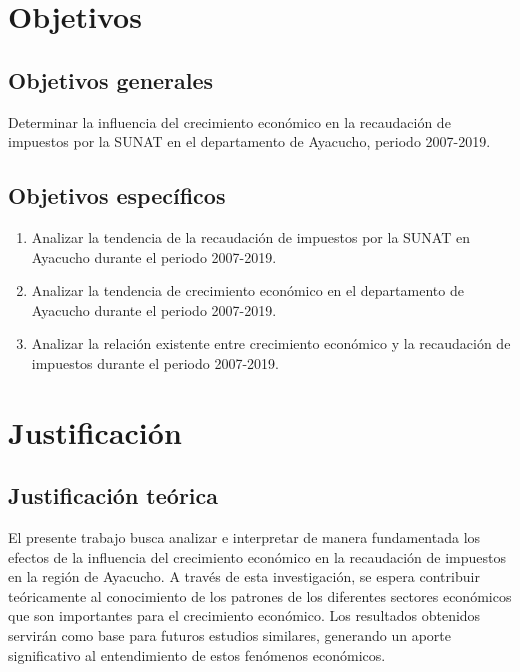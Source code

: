 \documentclass[
  jou,
  floatsintext,
  longtable,
  a4paper,
  nolmodern,
  notxfonts,
  notimes,
  12pt,
  colorlinks=true,linkcolor=blue,citecolor=blue,urlcolor=blue]{apa7}
\begin{document}
\section{Objetivos}\label{sec-objetivos}

\subsection{Objetivos generales}\label{sec-objetivos-generales}

Determinar la influencia del crecimiento económico en la recaudación de
impuestos por la SUNAT en el departamento de Ayacucho, periodo
2007-2019.

\subsection{Objetivos específicos}\label{sec-objetivos-especuxedficos}

\begin{enumerate}
\def\labelenumi{\arabic{enumi}.}
\item
  Analizar la tendencia de la recaudación de impuestos por la SUNAT en
  Ayacucho durante el periodo 2007-2019.
\item
  Analizar la tendencia de crecimiento económico en el departamento de
  Ayacucho durante el periodo 2007-2019.
\item
  Analizar la relación existente entre crecimiento económico y la
  recaudación de impuestos durante el periodo 2007-2019.
\end{enumerate}

\section{Justificación}\label{sec-justificaciuxf3n}

\subsection{Justificación
teórica}\label{sec-justificaciuxf3n-teuxf3rica}

El presente trabajo busca analizar e interpretar de manera fundamentada
los efectos de la influencia del crecimiento económico en la recaudación
de impuestos en la región de Ayacucho. A través de esta investigación,
se espera contribuir teóricamente al conocimiento de los patrones de los
diferentes sectores económicos que son importantes para el crecimiento
económico. Los resultados obtenidos servirán como base para futuros
estudios similares, generando un aporte significativo al entendimiento
de estos fenómenos económicos.
\end{document}

